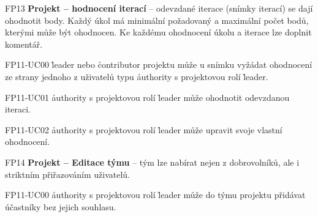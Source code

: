 \begin{dl}
   \item[FP13]
   \textbf{Projekt – hodnocení iterací} – odevzdané iterace (snímky iterací) se dají ohodnotit body.
   Každý úkol má minimální požadovaný a maximální počet bodů, kterými může být ohodnocen.
   Ke každému ohodnocení úkolu a iterace lze doplnit komentář.
   \begin{dl}
      \item[FP11-UC00] \h{leader} nebo \h{contributor} projektu může u snímku vyžádat ohodnocení ze strany jednoho z uživatelů typu \h{authority} s projektovou rolí \h{leader}.
      \item[FP11-UC01] \h{authority} s projektovou rolí \h{leader} může ohodnotit odevzdanou iteraci.
      \item[FP11-UC02] \h{authority} s projektovou rolí \h{leader} může upravit svoje vlastní ohodnocení.
   \end{dl}

   \item[FP14]
   \textbf{Projekt – Editace týmu} – tým lze nabírat nejen z dobrovolníků, ale i striktním přiřazováním uživatelů.
   \begin{dl}
      \item[FP11-UC00] \h{authority} s projektovou rolí \h{leader} může do týmu projektu přidávat účastníky bez jejich souhlasu.
   \end{dl}
\end{dl}
